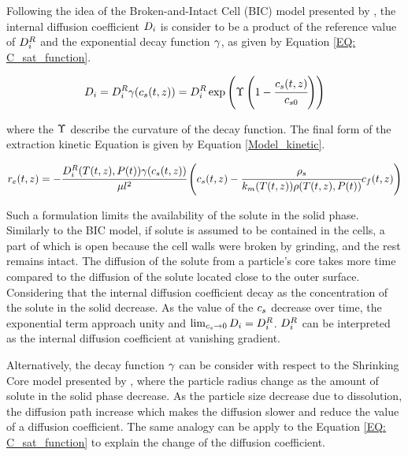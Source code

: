 \documentclass[../Article_Design_of_Experiment.tex]{subfiles}
\begin{document}
	Following the idea of the Broken-and-Intact Cell (BIC) model presented by \citet{Sovova2017}, the internal diffusion coefficient ${\color{black}D_i}$ is consider to be a product of the reference value of ${\color{black}D_i^R}$ and the exponential decay function ${\color{black} \gamma}$, as given by Equation \ref{EQ: C_sat_function}.
		
	{\footnotesize
		\begin{equation}
			{\color{black}D_i} = {\color{black}D_i^R} {\color{black} \gamma}({\color{black} c_s} (t,z)) = {\color{black}D_i^R} \exp\left( {\color{black}\Upsilon} \left( 1-\cfrac{{\color{black} c_s} (t,z) }{{\color{black}c_{s0}}} \right) \right) \label{EQ: C_sat_function}
		\end{equation} }
	
	where the ${\color{black}\Upsilon}$ describe the curvature of the decay function. The final form of the extraction kinetic Equation is given by Equation \ref{Model_kinetic}.
			
	{\scriptsize
		\begin{equation}
			\label{Model_kinetic}
				{\color{black}r_e}(t,z) = -\cfrac{{\color{black}D_i^R}({\color{black}T}(t,z), {\color{black}P}(t)) {\color{black} \gamma}({\color{black} c_s} (t,z)) }{{\color{black} \mu l^2} } \left({\color{black}{\color{black} c_s} }(t,z)  - \cfrac{{\color{black}\rho_s}}{{\color{black}k_m}({\color{black}T}(t,z)){\color{black}\rho}({\color{black}T}(t,z),{\color{black}P}(t))}  {\color{black}c_f}(t,z) \right)
		\end{equation} }
	
	Such a formulation limits the availability of the solute in the solid phase. Similarly to the BIC model, if solute is assumed to be contained in the cells, a part of which is open because the cell walls were broken by grinding, and the rest remains intact. The diffusion of the solute from a particle's core takes more time compared to the diffusion of the solute located close to the outer surface. Considering that the internal diffusion coefficient decay as the concentration of the solute in the solid decrease. As the value of the ${\color{black}c_s}$ decrease over time, the exponential term approach unity and $\lim_{ {\color{black}c_s} \rightarrow 0} {\color{black}D_i} =  {\color{black}D_i^R}$. ${\color{black}D_i^R}$ can be interpreted as the internal diffusion coefficient at vanishing gradient. 
		
	Alternatively, the decay function ${\color{black}\gamma}$ can be consider with respect to the Shrinking Core model presented by \citet{Goto1996}, where the particle radius change as the amount of solute in the solid phase decrease. As the particle size decrease due to dissolution, the diffusion path increase which makes the diffusion slower and reduce the value of a diffusion coefficient. The same analogy can be apply to the Equation \ref{EQ: C_sat_function} to explain the change of the diffusion coefficient.
		
\end{document}
